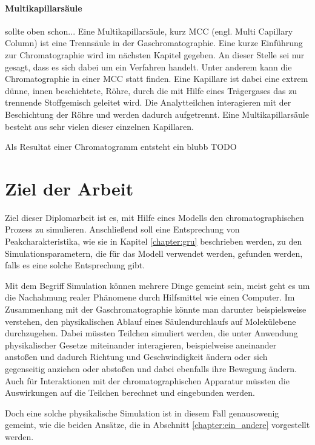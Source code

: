 \paragraph{Multikapillarsäule} sollte oben schon...
Eine Multikapillarsäule, kurz MCC (engl. Multi Capillary Column) ist eine Trennsäule in der Gaschromatographie. Eine kurze Einführung zur Chromatographie wird im nächsten Kapitel gegeben. An dieser Stelle sei nur gesagt, dass es sich dabei um ein Verfahren  handelt. Unter anderem kann die Chromatographie in einer MCC statt finden. Eine Kapillare ist dabei eine extrem dünne, innen beschichtete, Röhre, durch die mit Hilfe eines Trägergases das zu trennende Stoffgemisch geleitet wird. Die Analytteilchen interagieren mit der Beschichtung der Röhre und werden dadurch aufgetrennt. Eine Multikapillarsäule besteht aus sehr vielen dieser einzelnen Kapillaren.

Als Resultat einer Chromatogramm entsteht ein blubb TODO %


\section{Ziel der Arbeit}

Ziel dieser Diplomarbeit ist es, mit Hilfe eines Modells den chromatographischen Prozess zu simulieren. Anschließend soll eine Entsprechung von Peakcharakteristika, wie sie in Kapitel \ref{chapter:gru} beschrieben werden, zu den Simulationsparametern, die für das Modell verwendet werden, gefunden werden, falls es eine solche Entsprechung gibt.

Mit dem Begriff Simulation können mehrere Dinge gemeint sein, meist geht es um die Nachahmung realer Phänomene durch Hilfsmittel wie einen Computer. Im Zusammenhang mit der Gaschromatographie könnte man darunter beispielsweise verstehen, den physikalischen Ablauf eines Säulendurchlaufs auf Molekülebene durchzugehen. Dabei müssten Teilchen simuliert werden, die unter Anwendung physikalischer Gesetze miteinander interagieren, beispielweise aneinander anstoßen und dadurch Richtung und Geschwindigkeit ändern oder sich gegenseitig anziehen oder abstoßen und dabei ebenfalls ihre Bewegung ändern. Auch für Interaktionen mit der chromatographischen Apparatur müssten die Auswirkungen auf die Teilchen berechnet und eingebunden werden. 

Doch eine solche physikalische Simulation ist in diesem Fall genausowenig gemeint, wie die beiden Ansätze, die in Abschnitt \ref{chapter:ein_andere} vorgestellt werden.

